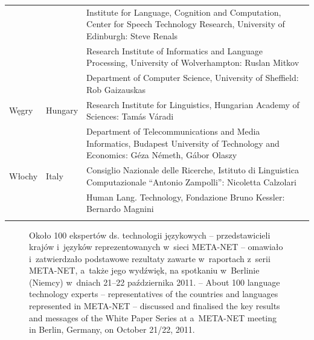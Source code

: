 \begin{longtable}{llp{115mm}}
\addlinespace & & Institute for Language, Cognition and Computation,
Center for Speech Technology Research, University of Edinburgh: Steve
Renals\\
\addlinespace & & Research Institute of Informatics and Language
Processing, University of Wolverhampton: Ruslan Mitkov\\
\addlinespace && Department of Computer Science, University of
Sheffield: Rob Gaizauskas\\
\addlinespace Węgry & \textcolor{grey1}{Hungary} & Research Institute
for Linguistics, Hungarian Academy of Sciences: Tamás Váradi\\
\addlinespace & & Department of Telecommunications and Media
Informatics, Budapest University of Technology and Economics: Géza
Németh, Gábor Olaszy\\
\addlinespace Włochy & \textcolor{grey1}{Italy} & Consiglio Nazionale
delle Ricerche, Istituto di Linguistica Computazionale \newline
“Antonio Zampolli”: Nicoletta Calzolari\\
\addlinespace & & Human Lang. Technology, Fondazione Bruno Kessler:
Bernardo Magnini\\
\addlinespace \end{longtable} \normalsize 

\renewcommand*{\figureformat}{} \renewcommand*{\captionformat}{} 

\begin{figure}[htb]  \center
  \caption{Około 100 ekspertów ds. technologii językowych --
przedstawicieli krajów i~języków reprezentowanych w~sieci META-NET
-- omawiało i~zatwierdzało podstawowe rezultaty zawarte w~raportach
z~serii META-NET, a~także jego wydźwięk, na spotkaniu w~Berlinie
(Niemcy) w~dniach 21--22 października 2011. --
  \textcolor{grey1}{About 100 language technology experts --
representatives of the countries and languages represented in META-NET
-- discussed and finalised the key results and messages of the White
Paper Series at a~META-NET meeting in Berlin, Germany, on October
21/22, 2011.}} \medskip {}
\end{figure} 

\cleardoublepage 

 \label{whitepaperseries} 

